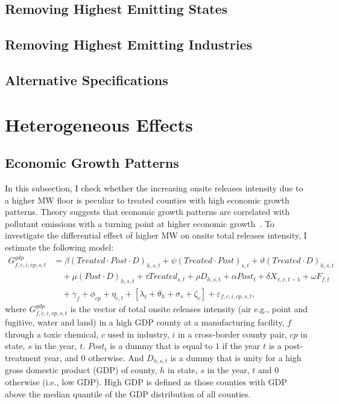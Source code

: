 \documentclass[12pt, english]{article}
\begin{document}
    \subsection{Removing Highest Emitting States}\label{subsec:removing-highest-emitting-states}

    \subsection{Removing Highest Emitting Industries}\label{subsec:removing-highest-emitting-industries}

    \subsection{Alternative Specifications}\label{subsec:alternative-specifications}


    \section{Heterogeneous Effects}\label{sec:heterogeneous-effects}

    \subsection{Economic Growth Patterns}\label{subsec:economic-growth-patterns}
    In this subsection, I check whether the increasing onsite releases intensity due to a higher MW floor is peculiar to treated counties with high economic growth patterns. Theory suggests that economic growth patterns are correlated with pollutant emissions with a turning point at higher economic growth~\parencite{grossman1995economic, shapiro2018pollution}. To investigate the differential effect of higher MW on onsite total releases intensity, I estimate the following model:
    \begin{align}
        G_{f,c,i,cp,s,t}^{gdp} &= \beta (Treated \cdot Post \cdot D)_{h,s,t} + \psi (Treated \cdot Post)_{s,t} + \vartheta (Treated \cdot D)_{h,s,t} \nonumber \\
        &\quad + \mu (Post \cdot D)_{h,s,t} + \tau Treated_{s,t} + \rho D_{h,s,t} + \alpha Post_{t} + \delta X_{v,c,t-1} + \omega F_{f,t} \nonumber \\
        &\quad + \gamma_{f} + \phi_{cp} + \eta_{c,t} + \left[\lambda_{t} + \theta_{h} + \sigma_{s} + \zeta_{c} \right] + \varepsilon_{f,c,i,cp,s,t},\label{eq:heterogeneous-onsite-releases-intensity-gdp}
    \end{align}
    where $G_{f,c,i,cp,s,t}^{gdp}$ is the vector of total onsite releases intensity (air e.g., point and fugitive, water and land) in a high GDP county at a manufacturing facility, $f$ through a toxic chemical, $c$ used in industry, $i$ in a cross-border county pair, $cp$ in state, $s$ in the year, $t$. $Post_{t}$ is a dummy that is equal to $1$ if the year $t$ is a post-treatment year, and $0$ otherwise. And $D_{h,s,t}$ is a dummy that is unity for a high gross domestic product (GDP) of county, $h$ in state, $s$ in the year, $t$ and $0$ otherwise (i.e., low GDP). High GDP is defined as those counties with GDP above the median quantile of the GDP distribution of all counties.
    
\end{document}
